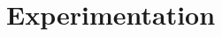 \documentclass[twoside,leqno,twocolumn]{article}
\newcommand{\authornote}[1]{(\footnote{Note to self: #1})}
\newcommand{\authorsnote}[1]{\authornote{#1}}
\begin{document}







\section{Experimentation}

\end{document}
